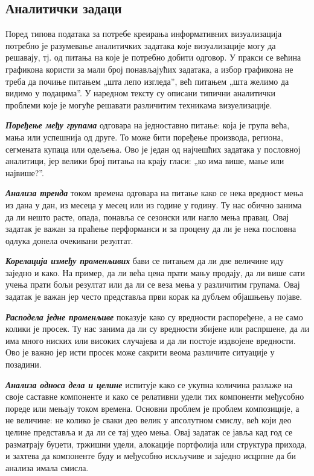 \subsection{Аналитички задаци}
Поред типова података за потребе креирања информативних визуализација потребно је разумевање аналитичких задатака које визуализације могу да решавају, тј. од питања на које је потребно добити одговор. У пракси се већина графикона користи за мали број понављајућих задатака, а избор графикона не треба да почиње питањем „шта лепо изгледа”, већ питањем „шта желимо да видимо у подацима”. У наредном тексту су описани типични аналитички проблеми које је могуће решавати различитим техникама визуелизације.

\textbf{\textit{Поређење међу групама}} одговара на једноставно питање: која је група већа, мања или успешнија од друге. То може бити поређење производа, региона, сегмената купаца или одељења. Ово је један од најчешћих задатака у пословној аналитици, јер велики број питања на крају гласи: „ко има више, мање или највише?”.

\textbf{\textit{Анализа тренда}} током времена одговара на питање како се нека вредност мења из дана у дан, из месеца у месец или из године у годину. Ту нас обично занима да ли нешто расте, опада, понавља се сезонски или нагло мења правац. Овај задатак је важан за праћење перформанси и за процену да ли је нека пословна одлука донела очекивани резултат.

\textbf{\textit{Корелација између променљивих}} бави се питањем да ли две величине иду заједно и како. На пример, да ли већа цена прати мању продају, да ли више сати учења прати бољи резултат или да ли се веза мења у различитим групама. Овај задатак је важан јер често представља први корак ка дубљем објашњењу појаве.

\textbf{\textit{Расподела једне променљиве}} показује како су вредности распоређене, а не само колики је просек. Ту нас занима да ли су вредности збијене или распршене, да ли има много ниских или високих случајева и да ли постоје издвојене вредности. Ово је важно јер исти просек може сакрити веома различите ситуације у позадини.

\textbf{\textit{Анализа односа дела и целине}} испитује како се укупна количина разлаже на своје саставне компоненте и како се релативни удели тих компоненти међусобно пореде или мењају током времена. Основни проблем је проблем композиције, а не величине: не колико је сваки део велик у апсолутном смислу, већ који део целине представља и да ли се тај удео мења. Овај задатак се јавља кад год се разматрају буџети, тржишни удели, алокације портфолија или структура прихода, и захтева да компоненте буду и међусобно искључиве и заједно исцрпне да би анализа имала смисла.

